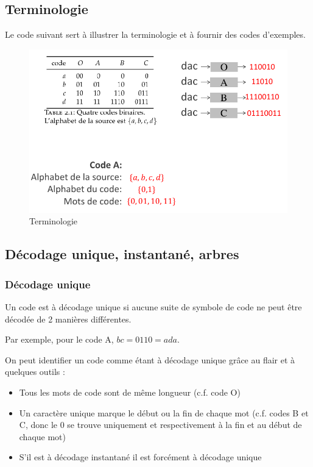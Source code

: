 \documentclass[11pt,a4paper]{article}
\renewcommand{\)}{\right)}
\renewcommand{\(}{\left(}
\begin{document}
\subsection{Terminologie}
Le code suivant sert à illustrer la terminologie et à fournir des codes d'exemples.
\begin{figure}[!h]
	\centering
	\includegraphics[scale=0.5]{images/terminologie_codage}
	\caption{Terminologie}
	\label{terminologie}
\end{figure}
\subsection{Décodage unique, instantané, arbres}
\subsubsection{Décodage unique}
Un code est à décodage unique si aucune suite de symbole de code ne peut être décodée de 2 manières différentes. 
\begin{exemple}[0.55]
	Par exemple, pour le code A, $bc = 0110 = ada$.
\end{exemple}
 On peut identifier un code comme étant à décodage unique grâce au flair et à quelques outils :
\begin{itemize}
	\item Tous les mots de code sont de même longueur (c.f. code O)
	\item Un caractère unique marque le début ou la fin de chaque mot (c.f. codes B et C, donc le 0 se trouve uniquement et respectivement à la fin et au début de chaque mot)
	\item S'il est à décodage instantané il est forcément à décodage unique
\end{itemize}
\end{document}
